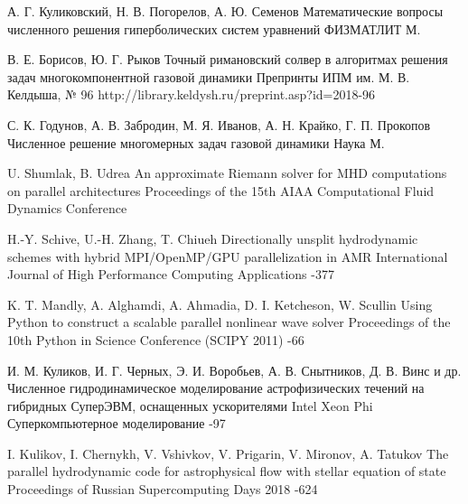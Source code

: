 \documentclass[utf8]{psta}
\begin{document}
\begin{thebibliography}{30}

\by А. Г. Куликовский, Н. В. Погорелов, А. Ю. Семенов
\book Математические вопросы численного решения гиперболических систем уравнений
\publ ФИЗМАТЛИТ
\publaddr М.

\by В. Е. Борисов, Ю. Г. Рыков
\preprint Точный римановский солвер в алгоритмах решения задач многокомпонентной газовой динамики
\preprintinfo Препринты ИПМ им. М. В. Келдыша, № 96
\URL http://library.keldysh.ru/preprint.asp?id=2018-96

\by С. К. Годунов, А. В. Забродин, М. Я. Иванов, А. Н. Крайко, Г. П. Прокопов
\book Численное решение многомерных задач газовой динамики
\publ Наука
\publaddr М.

\by U. Shumlak, B. Udrea
\paper An approximate Riemann solver for MHD computations on parallel architectures
\jour Proceedings of the 15th AIAA Computational Fluid Dynamics Conference

\by H.-Y. Schive, U.-H. Zhang, T. Chiueh
\paper Directionally unsplit hydrodynamic schemes with hybrid MPI/OpenMP/GPU parallelization in AMR
\jour International Journal of High Performance Computing Applications
-377

\by K. T. Mandly, A. Alghamdi, A. Ahmadia, D. I. Ketcheson, W. Scullin
\paper Using Python to construct a scalable parallel nonlinear wave solver
\jour Proceedings of the 10th Python in Science Conference (SCIPY 2011)
-66

\by И. М. Куликов, И. Г. Черных, Э. И. Воробьев, А. В. Снытников, Д. В. Винс и др.
\paper Численное гидродинамическое моделирование астрофизических течений на гибридных СуперЭВМ, оснащенных ускорителями Intel Xeon Phi
\jour Суперкомпьютерное моделирование
-97

\by I. Kulikov, I. Chernykh, V. Vshivkov, V. Prigarin, V. Mironov, A. Tatukov
\paper The parallel hydrodynamic code for astrophysical flow with stellar equation of state
\jour Proceedings of Russian Supercomputing Days 2018
-624


\end{thebibliography}
\end{document}
